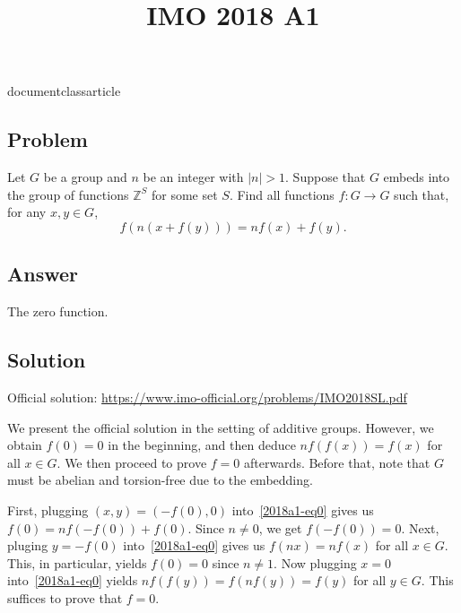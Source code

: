 documentclass{article}

\usepackage{amsmath, amsfonts, amssymb, amsthm}
\usepackage{hyperref}

\setlength{\parindent}{0pt}
\setlength{\parskip}{5pt}

\newcommand{\Z}{\mathbb{Z}}
\newcommand{\Q}{\mathbb{Q}}

\title{IMO 2018 A1}
\author{}
\date{}



\maketitle



\subsection*{Problem}

Let $G$ be a group and $n$ be an integer with $|n| > 1$.
Suppose that $G$ embeds into the group of functions $\Z^S$ for some set $S$.
Find all functions $f : G \to G$ such that, for any $x, y \in G$,
\[ f(n(x + f(y))) = n f(x) + f(y). \tag{*}\label{2018a1-eq0} \]



\subsection*{Answer}

The zero function.



\subsection*{Solution}

Official solution: \url{https://www.imo-official.org/problems/IMO2018SL.pdf}

We present the official solution in the setting of additive groups.
However, we obtain $f(0) = 0$ in the beginning, and then deduce $n f(f(x)) = f(x)$ for all $x \in G$.
We then proceed to prove $f = 0$ afterwards.
Before that, note that $G$ must be abelian and torsion-free due to the embedding.

First, plugging $(x, y) = (-f(0), 0)$ into~\eqref{2018a1-eq0} gives us $f(0) = n f(-f(0)) + f(0)$.
Since $n \neq 0$, we get $f(-f(0)) = 0$.
Next, pluging $y = -f(0)$ into~\eqref{2018a1-eq0} gives us $f(nx) = n f(x)$ for all $x \in G$.
This, in particular, yields $f(0) = 0$ since $n \neq 1$.
Now plugging $x = 0$ into~\eqref{2018a1-eq0} yields $n f(f(y)) = f(n f(y)) = f(y)$ for all $y \in G$.
This suffices to prove that $f = 0$.

